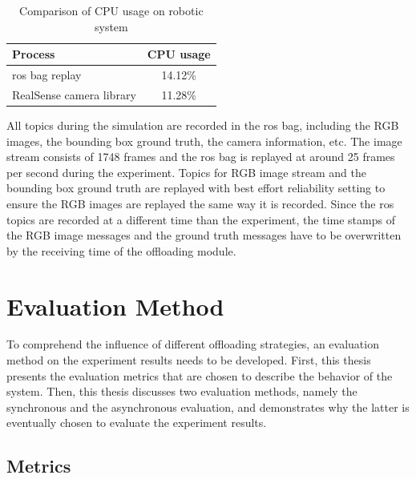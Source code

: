 \begin{table}[htp]
    \centering
    \begin{tabular}{lc}
    \toprule
    Process&                    CPU usage\\
    \midrule
    \gls{ros} bag replay&       14.12\%\\
    RealSense camera library&   11.28\%\\
    \bottomrule
    \end{tabular}
    \caption{Comparison of CPU usage on robotic system}
    \label{tab:ros_bag_comparison}
\end{table}

All topics during the simulation are recorded in the \gls{ros} bag, including the RGB images, the bounding box ground truth, the camera information, etc. The image stream consists of 1748 frames and the \gls{ros} bag is replayed at around 25 frames per second during the experiment. Topics for RGB image stream and the bounding box ground truth are replayed with best effort reliability setting to ensure the RGB images are replayed the same way it is recorded. Since the \gls{ros} topics are recorded at a different time than the experiment, the time stamps of the RGB image messages and the ground truth messages have to be overwritten by the receiving time of the offloading module.

\section{Evaluation Method}\label{sec:general_setup:evaluation}

To comprehend the influence of different offloading strategies, an evaluation method on the experiment results needs to be developed. First, this thesis presents the evaluation metrics that are chosen to describe the behavior of the system. Then, this thesis discusses two evaluation methods, namely the synchronous and the asynchronous evaluation, and demonstrates why the latter is eventually chosen to evaluate the experiment results.

\subsection{Metrics}



